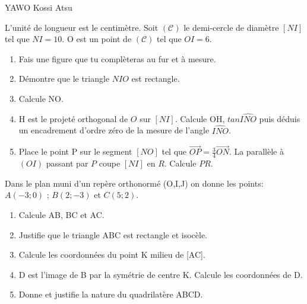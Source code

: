 \documentclass[12pt,a4paper]{book}
\newcommand{\prof}{YAWO Kossi Atsu}
\begin{document}
\begin{revision}{\prof}
\vspace{0.3cm}

\begin{exo}[5]
L'unité de longueur est le centimètre. Soit $\mathcal{(C)}$ le demi-cercle de diamètre $[NI]$ tel que $NI=10$. O est un point de $\mathcal{(C)}$ tel que $OI=6$.
\begin{enumerate}
\item Fais une figure que tu complèteras au fur et à mesure.
\item Démontre que le triangle $NIO$ est rectangle.
\item Calcule NO.
\item H est le projeté orthogonal de $O$ sur $[NI]$. Calcule OH, $tan\widehat{INO}$ puis déduis un encadrement d'ordre zéro de la mesure de l'angle $\widehat{INO}$.
\item Place le point P sur le segment $[NO]$ tel que $\overrightarrow{OP}=\frac{3}{4}\overrightarrow{ON}$. La parallèle à $(OI)$ passant par $P$ coupe $[NI]$ en $R$. Calcule $PR$.
\end{enumerate}
\end{exo}

\vspace{0.3cm}

\begin{exo}
Dans le plan muni d'un repère orthonormé (O,I,J) on donne les points: $A(-3;0)$ ; $B(2;-3)$ et $C(5;2)$.
\begin{enumerate}
\item Calcule AB, BC et AC.
\item Justifie que le triangle ABC est rectangle et isocèle.
\item Calcule les coordonnées du point K milieu de [AC].
\item D est l'image de B par la symétrie de centre K. Calcule les coordonnées de D.
\item Donne et justifie la nature du quadrilatère ABCD.
\end{enumerate}
\end{exo}

\vspace{0.3cm}


\end{revision}
\end{document}
